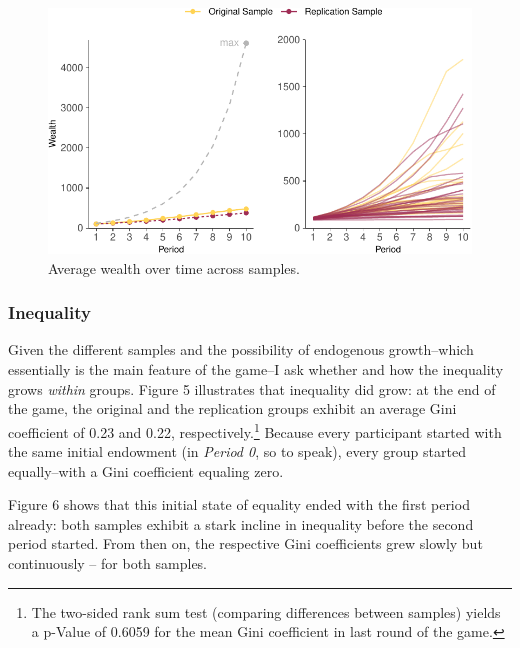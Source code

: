 \documentclass[
  authoryear,
  preprint,
  3p]{elsarticle}
\begin{document}
\begin{figure}

{\centering \includegraphics{paper_files/figure-pdf/growthHeterogeneityViz-1.pdf}

}

\caption{Average wealth over time across samples.}

\end{figure}

\hypertarget{inequality}{%
\subsubsection{Inequality}\label{inequality}}

Given the different samples and the possibility of endogenous
growth--which essentially is the main feature of the game--I ask whether
and how the inequality grows \emph{within} groups. Figure 5 illustrates
that inequality did grow: at the end of the game, the original and the
replication groups exhibit an average Gini coefficient of 0.23 and 0.22,
respectively.\footnote{The two-sided rank sum test (comparing
  differences between samples) yields a p-Value of 0.6059 for the mean
  Gini coefficient in last round of the game.} Because every participant
started with the same initial endowment (in \emph{Period 0}, so to
speak), every group started equally--with a Gini coefficient equaling
zero.

Figure 6 shows that this initial state of equality ended with the first
period already: both samples exhibit a stark incline in inequality
before the second period started. From then on, the respective Gini
coefficients grew slowly but continuously -- for both samples.
\end{document}
